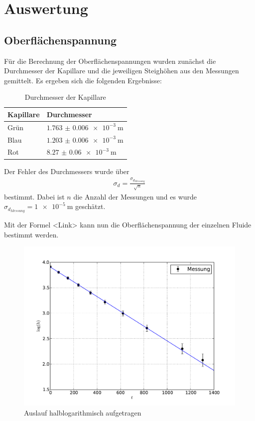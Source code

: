 \section{Auswertung}
\subsection{Oberflächenspannung}
Für die Berechnung der Oberflächenspannungen wurden zunächst die Durchmesser der Kapillare und die jeweiligen Steighöhen aus den Messungen gemittelt. Es ergeben sich die folgenden Ergebnisse:
\begin{table}[!htbp]
\centering
	\begin{tabular}{l|l}
		\hline
		Kapillare & Durchmesser \\
		\hline \hline
		Grün  & $\SI{1.763(6)e-3}{\m}$  \\
		Blau & $\SI{1.203(6)e-3}{\m}$  \\
		Rot & $\SI{8.27(6)e-3}{\m}$ \\
		\hline
	\end{tabular}
	\caption{Durchmesser der Kapillare}
	\label{tab:1}
\end{table}
\newline
Der Fehler des Durchmessers wurde über
\begin{align*}
\sigma_d = \frac{\sigma_{d_{Messung}}}{\sqrt{n}}
\end{align*}
bestimmt. Dabei ist $n$ die Anzahl der Messungen und es wurde $\sigma_{d_{Messung}} = \SI{1e-5}{\m}$ geschätzt.

Mit der Formel <Link> kann nun die Oberflächenspannung der einzelnen Fluide bestimmt werden. 

\begin{figure}[!htbp]
\begin{center}
	\includegraphics[scale=0.70]{Plot_Aufg2b}
\end{center}
\caption{Auslauf halblogarithmisch aufgetragen}
\end{figure}